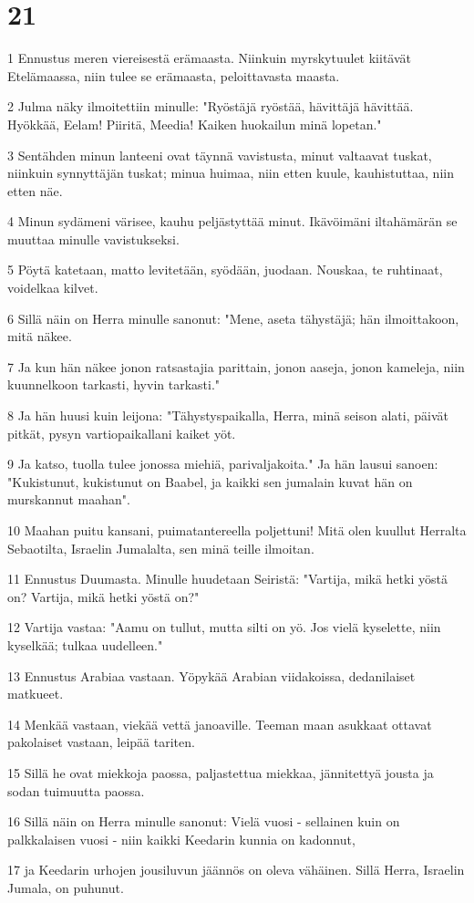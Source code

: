 \chapter{21}

\par 1 Ennustus meren viereisestä erämaasta. Niinkuin myrskytuulet kiitävät Etelämaassa, niin tulee se erämaasta, peloittavasta maasta.
\par 2 Julma näky ilmoitettiin minulle: "Ryöstäjä ryöstää, hävittäjä hävittää. Hyökkää, Eelam! Piiritä, Meedia! Kaiken huokailun minä lopetan."
\par 3 Sentähden minun lanteeni ovat täynnä vavistusta, minut valtaavat tuskat, niinkuin synnyttäjän tuskat; minua huimaa, niin etten kuule, kauhistuttaa, niin etten näe.
\par 4 Minun sydämeni värisee, kauhu peljästyttää minut. Ikävöimäni iltahämärän se muuttaa minulle vavistukseksi.
\par 5 Pöytä katetaan, matto levitetään, syödään, juodaan. Nouskaa, te ruhtinaat, voidelkaa kilvet.
\par 6 Sillä näin on Herra minulle sanonut: "Mene, aseta tähystäjä; hän ilmoittakoon, mitä näkee.
\par 7 Ja kun hän näkee jonon ratsastajia parittain, jonon aaseja, jonon kameleja, niin kuunnelkoon tarkasti, hyvin tarkasti."
\par 8 Ja hän huusi kuin leijona: "Tähystyspaikalla, Herra, minä seison alati, päivät pitkät, pysyn vartiopaikallani kaiket yöt.
\par 9 Ja katso, tuolla tulee jonossa miehiä, parivaljakoita." Ja hän lausui sanoen: "Kukistunut, kukistunut on Baabel, ja kaikki sen jumalain kuvat hän on murskannut maahan".
\par 10 Maahan puitu kansani, puimatantereella poljettuni! Mitä olen kuullut Herralta Sebaotilta, Israelin Jumalalta, sen minä teille ilmoitan.
\par 11 Ennustus Duumasta. Minulle huudetaan Seiristä: "Vartija, mikä hetki yöstä on? Vartija, mikä hetki yöstä on?"
\par 12 Vartija vastaa: "Aamu on tullut, mutta silti on yö. Jos vielä kyselette, niin kyselkää; tulkaa uudelleen."
\par 13 Ennustus Arabiaa vastaan. Yöpykää Arabian viidakoissa, dedanilaiset matkueet.
\par 14 Menkää vastaan, viekää vettä janoaville. Teeman maan asukkaat ottavat pakolaiset vastaan, leipää tariten.
\par 15 Sillä he ovat miekkoja paossa, paljastettua miekkaa, jännitettyä jousta ja sodan tuimuutta paossa.
\par 16 Sillä näin on Herra minulle sanonut: Vielä vuosi - sellainen kuin on palkkalaisen vuosi - niin kaikki Keedarin kunnia on kadonnut,
\par 17 ja Keedarin urhojen jousiluvun jäännös on oleva vähäinen. Sillä Herra, Israelin Jumala, on puhunut.

